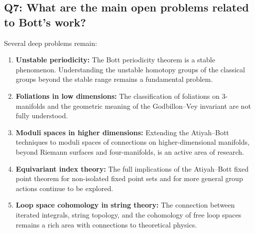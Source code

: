 \subsection*{Q7: What are the main open problems related to Bott's work?}

Several deep problems remain:
\begin{enumerate}
    \item \textbf{Unstable periodicity:} The Bott periodicity theorem is a stable phenomenon. Understanding the unstable homotopy groups of the classical groups beyond the stable range remains a fundamental problem.
    \item \textbf{Foliations in low dimensions:} The classification of foliations on 3-manifolds and the geometric meaning of the Godbillon--Vey invariant are not fully understood.
    \item \textbf{Moduli spaces in higher dimensions:} Extending the Atiyah--Bott techniques to moduli spaces of connections on higher-dimensional manifolds, beyond Riemann surfaces and four-manifolds, is an active area of research.
    \item \textbf{Equivariant index theory:} The full implications of the Atiyah--Bott fixed point theorem for non-isolated fixed point sets and for more general group actions continue to be explored.
    \item \textbf{Loop space cohomology in string theory:} The connection between iterated integrals, string topology, and the cohomology of free loop spaces remains a rich area with connections to theoretical physics.
\end{enumerate}

